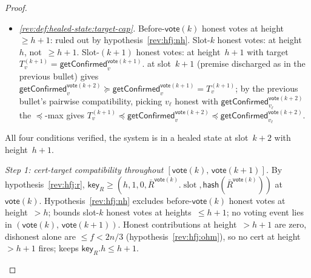 \documentclass{article}
\newcommand{\slot}[0]{\ensuremath{\operatorname{\mathrm{slot}}}}
\newcommand{\height}{\mathsf{height}}
\newcommand{\hash}{\mathsf{hash}}
\newcommand{\key}{\mathsf{key}}
\newcommand{\vote}{\mathsf{vote}}
\newcommand{\comm}[1]{\bar{#1}}
\newcommand{\getConfirmed}{\textsf{getConfirmed}\xspace}
\theoremstyle{plain}
\theoremstyle{definition}
\theoremstyle{remark}
\begin{document}
\begin{proof}
\begin{description}
\begin{itemize}
  \item \emph{\ref{rev:def:healed-state:target-cap}.}
  Before-$\vote(k)$ honest votes at height~$\geq h+1$: ruled out by hypothesis~\ref{rev:hfj:nh}. Slot-$k$ honest votes: at height~$h$, not~$\geq h+1$. Slot-$(k+1)$ honest votes: at height~$h+1$ with target $T_v^{(k+1)} = \getConfirmed_v^{\vote(k+1)}$.  at slot~$k+1$ (premise discharged as in the previous bullet) gives $\getConfirmed_v^{\vote(k+2)} \succeq \getConfirmed_v^{\vote(k+1)} = T_v^{(k+1)}$; by the previous bullet's pairwise compatibility, picking $v_\ell$ honest with $\getConfirmed_{v_\ell}^{\vote(k+2)}$ the $\preceq$-max gives $T_v^{(k+1)} \preceq \getConfirmed_v^{\vote(k+2)} \preceq \getConfirmed_{v_\ell}^{\vote(k+2)}$.
\end{itemize}
All four conditions verified, the system is in a healed state at slot~$k+2$ with height~$h+1$.


\item[{Case 2: $a^k_v.\height = h+1$ for some honest~$v$.}]\hfill

\emph{Step 1: cert-target compatibility throughout $[\vote(k),\, \vote(k+1)]$.}
By hypothesis~\ref{rev:hfj:r}, $\key_R \geq (h, 1, 0, \comm{R}^{\vote(k)}.\slot, \hash(\comm{R}^{\vote(k)}))$ at $\vote(k)$. Hypothesis~\ref{rev:hfj:nh} excludes before-$\vote(k)$ honest votes at height~$>h$;  bounds slot-$k$ honest votes at heights~$\leq h+1$; no voting event lies in $(\vote(k),\, \vote(k+1))$. Honest contributions at height~$>h+1$ are zero, dishonest alone are $\leq f < 2n/3$ (hypothesis~\ref{rev:hfj:ohm}), so no cert at height~$>h+1$ fires;  keeps $\key_R.h \leq h+1$.


\end{description}
\end{proof}
\end{document}
